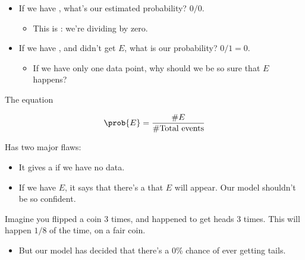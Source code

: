         \begin{itemize}
            \item If we have , what's our estimated probability? $0/0$.
            
                \begin{itemize}
                    \item This is : we're dividing by zero.
                \end{itemize}
    
            \item If we have , and didn't get $E$, what is our probability? $0/1=0$.
    
                \begin{itemize}
                    \item If we have only one data point, why should we be so sure that $E$  happens?
                \end{itemize}
        \end{itemize}
    
        \begin{concept}
            The equation
    
            \begin{equation*}
                \prob{E} = \frac{\#E}{\#\text{Total events}}
            \end{equation*}
    
            Has two major flaws:
    
            \begin{itemize}
                \item It gives a  if we have no data.
    
                \item If we have  $E$, it says that there's a  that $E$ will appear. Our model shouldn't be so confident.
            \end{itemize}
        \end{concept}
    
        \miniex Imagine you flipped a coin 3 times, and happened to get heads 3 times. This will happen $1/8$ of the time, on a fair coin.
    
        \begin{itemize}
            \item But our model has decided that there's a 0\% chance of ever getting tails.
        \end{itemize}
    

